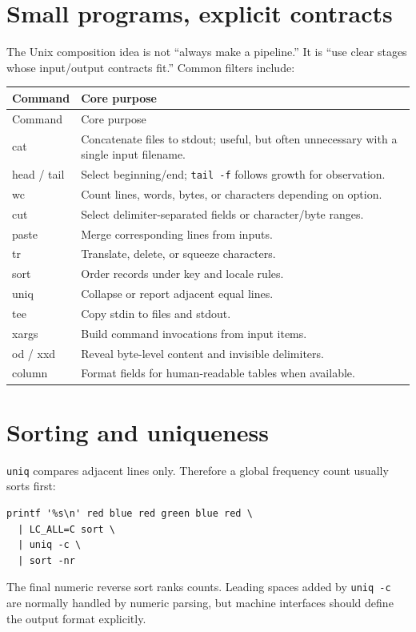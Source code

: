 \documentclass[11pt,oneside,openany]{book}
\begin{document}
\section{Small programs, explicit contracts}
The Unix composition idea is not “always make a pipeline.” It is “use clear stages whose input/output contracts fit.” Common filters include:
\begin{longtable}{>{\ttfamily}p{}p{}}
\toprule
Command & Core purpose \\
\midrule
\endfirsthead\toprule Command & Core purpose \\
\midrule\endhead
cat & Concatenate files to stdout; useful, but often unnecessary with a single input filename. \\
head / tail & Select beginning/end; \texttt{tail -f} follows growth for observation. \\
wc & Count lines, words, bytes, or characters depending on option. \\
cut & Select delimiter-separated fields or character/byte ranges. \\
paste & Merge corresponding lines from inputs. \\
tr & Translate, delete, or squeeze characters. \\
sort & Order records under key and locale rules. \\
uniq & Collapse or report adjacent equal lines. \\
tee & Copy stdin to files and stdout. \\
xargs & Build command invocations from input items. \\
od / xxd & Reveal byte-level content and invisible delimiters. \\
column & Format fields for human-readable tables when available. \\
\bottomrule
\end{longtable}

\section{Sorting and uniqueness}
\texttt{uniq} compares adjacent lines only. Therefore a global frequency count usually sorts first:
\begin{lstlisting}
printf '%s\n' red blue red green blue red \
  | LC_ALL=C sort \
  | uniq -c \
  | sort -nr
\end{lstlisting}
The final numeric reverse sort ranks counts. Leading spaces added by \texttt{uniq -c} are normally handled by numeric parsing, but machine interfaces should define the output format explicitly.
\end{document}
